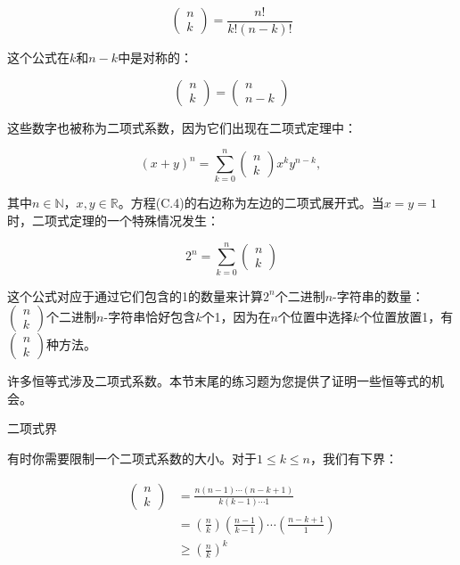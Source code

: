 \documentclass[lang=cn,newtx,10pt,scheme=chinese]{elegantbook}
\begin{document}
$$
\left(\begin{array}{l}
n \\
k
\end{array}\right)=\frac{n !}{k !(n-k) !}
$$

这个公式在$k$和$n-k$中是对称的：

$$
\left(\begin{array}{l}
n \\
k
\end{array}\right)=\left(\begin{array}{c}
n \\
n-k
\end{array}\right)
$$

这些数字也被称为二项式系数，因为它们出现在二项式定理中：

$$
(x+y)^n=\sum_{k=0}^n\left(\begin{array}{l}
n \\
k
\end{array}\right) x^k y^{n-k} \text {, }
$$

其中$n \in \mathbb{N}$，$x, y \in \mathbb{R}$。方程(C.4)的右边称为左边的二项式展开式。当$x=y=1$时，二项式定理的一个特殊情况发生：

$$
2^n=\sum_{k=0}^n\left(\begin{array}{l}
n \\
k
\end{array}\right)
$$

这个公式对应于通过它们包含的1的数量来计算$2^n$个二进制$n$-字符串的数量：$\left(\begin{array}{l}n \\ k\end{array}\right)$个二进制$n$-字符串恰好包含$k$个1，因为在$n$个位置中选择$k$个位置放置1，有$\left(\begin{array}{l}n \\ k\end{array}\right)$种方法。

许多恒等式涉及二项式系数。本节末尾的练习题为您提供了证明一些恒等式的机会。

二项式界

有时你需要限制一个二项式系数的大小。对于$1 \leq k \leq n$，我们有下界：

$$
\begin{aligned}
\left(\begin{array}{l}
n \\
k
\end{array}\right) & =\frac{n(n-1) \cdots(n-k+1)}{k(k-1) \cdots 1} \\
& =\left(\frac{n}{k}\right)\left(\frac{n-1}{k-1}\right) \cdots\left(\frac{n-k+1}{1}\right) \\
& \geq\left(\frac{n}{k}\right)^k
\end{aligned}
$$
\end{document}
